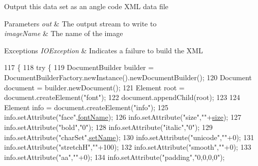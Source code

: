 Output this data set as an angle code X\+ML data file


\begin{DoxyParams}{Parameters}
{\em out} & The output stream to write to \\
\hline
{\em image\+Name} & The name of the image \\
\hline
\end{DoxyParams}

\begin{DoxyExceptions}{Exceptions}
{\em I\+O\+Exception} & Indicates a failure to build the X\+ML \\
\hline
\end{DoxyExceptions}

\begin{DoxyCode}
117                                                                                      \{
118         \textcolor{keywordflow}{try} \{
119             DocumentBuilder builder = DocumentBuilderFactory.newInstance().newDocumentBuilder();
120             Document document = builder.newDocument();
121             Element root = document.createElement(\textcolor{stringliteral}{"font"});
122             document.appendChild(root);
123             
124             Element info = document.createElement(\textcolor{stringliteral}{"info"});
125             info.setAttribute(\textcolor{stringliteral}{"face"},\mbox{\hyperlink{classorg_1_1newdawn_1_1slick_1_1tools_1_1hiero_1_1_data_set_ab0f4c67d67a65d79f10572e7ce459769}{fontName}});
126             info.setAttribute(\textcolor{stringliteral}{"size"},\textcolor{stringliteral}{""}+\mbox{\hyperlink{classorg_1_1newdawn_1_1slick_1_1tools_1_1hiero_1_1_data_set_ac4d3e35615d65f0ed46ff2cea9dcc895}{size}});
127             info.setAttribute(\textcolor{stringliteral}{"bold"},\textcolor{stringliteral}{"0"});
128             info.setAttribute(\textcolor{stringliteral}{"italic"},\textcolor{stringliteral}{"0"});
129             info.setAttribute(\textcolor{stringliteral}{"charSet"},\mbox{\hyperlink{classorg_1_1newdawn_1_1slick_1_1tools_1_1hiero_1_1_data_set_aa99e808e25a854b36feda6b64cb08bc9}{setName}});
130             info.setAttribute(\textcolor{stringliteral}{"unicode"},\textcolor{stringliteral}{""}+0);
131             info.setAttribute(\textcolor{stringliteral}{"stretchH"},\textcolor{stringliteral}{""}+100);
132             info.setAttribute(\textcolor{stringliteral}{"smooth"},\textcolor{stringliteral}{""}+0);
133             info.setAttribute(\textcolor{stringliteral}{"aa"},\textcolor{stringliteral}{""}+0);
134             info.setAttribute(\textcolor{stringliteral}{"padding"},\textcolor{stringliteral}{"0,0,0,0"});

\end{DoxyCode}
